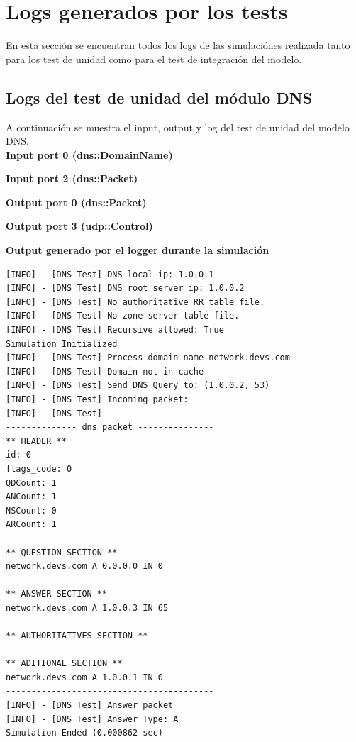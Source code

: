 \documentclass[10pt,a4paper]{article}
\begin{document}
\newpage

\appendix
\section{Logs generados por los tests}
\label{appendix: logs}
En esta sección se encuentran todos los logs de las simulaciónes realizada tanto para los test de unidad como para el test de integración del modelo.

\subsection{Logs del test de unidad del módulo DNS}
\label{appendix: dns unit test}

A continuación se muestra el input, output y log del test de unidad del modelo DNS.\\

\textbf{Input port 0 (dns::DomainName)}


\textbf{Input port 2 (dns::Packet)}


\textbf{Output port 0 (dns::Packet)}


\textbf{Output port 3 (udp::Control)}


\textbf{Output generado por el logger durante la simulación}
\begin{lstlisting}
[INFO] - [DNS Test] DNS local ip: 1.0.0.1
[INFO] - [DNS Test] DNS root server ip: 1.0.0.2
[INFO] - [DNS Test] No authoritative RR table file.
[INFO] - [DNS Test] No zone server table file.
[INFO] - [DNS Test] Recursive allowed: True
Simulation Initialized
[INFO] - [DNS Test] Process domain name network.devs.com
[INFO] - [DNS Test] Domain not in cache
[INFO] - [DNS Test] Send DNS Query to: (1.0.0.2, 53)
[INFO] - [DNS Test] Incoming packet:
[INFO] - [DNS Test] 
-------------- dns packet ---------------
** HEADER ** 
id: 0
flags_code: 0
QDCount: 1
ANCount: 1
NSCount: 0
ARCount: 1

** QUESTION SECTION ** 
network.devs.com A 0.0.0.0 IN 0 

** ANSWER SECTION ** 
network.devs.com A 1.0.0.3 IN 65 

** AUTHORITATIVES SECTION ** 

** ADITIONAL SECTION ** 
network.devs.com A 1.0.0.1 IN 0 
-----------------------------------------
[INFO] - [DNS Test] Answer packet
[INFO] - [DNS Test] Answer Type: A
Simulation Ended (0.000862 sec)
\end{lstlisting}
\end{document}
